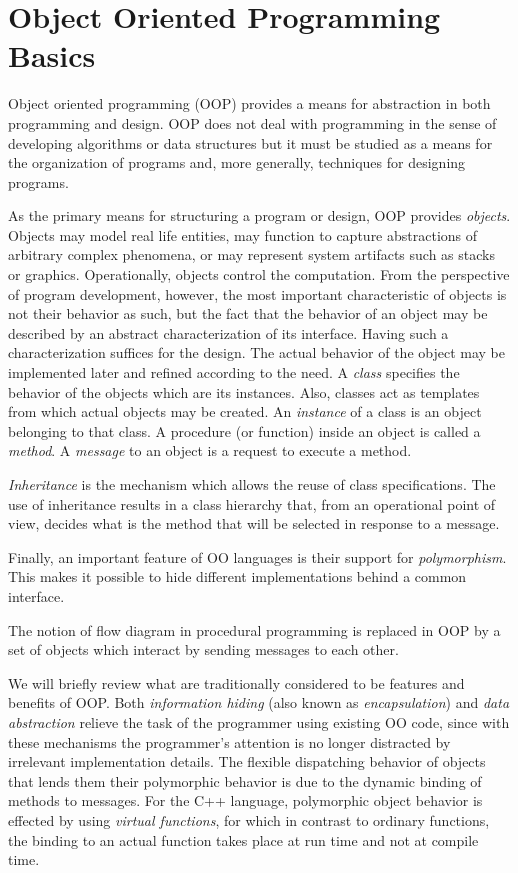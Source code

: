 \chapter{Object Oriented Programming Basics} \label{app:oo}

Object oriented programming (OOP) \cite{eliens} provides a means for
abstraction in both programming and design. OOP does not deal with
programming in the sense of developing algorithms or data structures
but it must be studied as a means for the organization of programs
and, more generally, techniques for designing programs.

As the primary means for structuring a program or design, OOP provides
\emph{objects}. Objects may model real life entities, may function to
capture abstractions of arbitrary complex phenomena, or may represent
system artifacts such as stacks or graphics.  Operationally, objects
control the computation. From the perspective of program development,
however, the most important characteristic of objects is not their
behavior as such, but the fact that the behavior of an object may be
described by an abstract characterization of its interface. Having
such a characterization suffices for the design. The actual behavior
of the object may be implemented later and refined according to the
need. A \emph{class} specifies the behavior of the objects which are
its instances. Also, classes act as templates from which actual
objects may be created.  An \emph{instance} of a class is an object
belonging to that class. A procedure (or function) inside an object is
called a \emph{method}. A \emph{message} to an object is a request to
execute a method.

\emph{Inheritance} is the mechanism which allows the reuse of class
specifications. The use of inheritance results in a class hierarchy
that, from an operational point of view, decides what is the method
that will be selected in response to a message.

Finally, an important feature of OO languages is their support for
\emph{polymorphism}. This makes it possible to hide different
implementations behind a common interface.

The notion of flow diagram in procedural programming is replaced in
OOP by a set of objects which interact by sending messages to each
other.

We will briefly review what are traditionally considered to be
features and benefits of OOP. Both \emph{information hiding} (also
known as \emph{encapsulation}) and \emph{data abstraction} relieve the
task of the programmer using existing OO code, since with these
mechanisms the programmer's attention is no longer distracted by
irrelevant implementation details. The flexible dispatching behavior
of objects that lends them their polymorphic behavior is due to the
dynamic binding of methods to messages. For the C++ language,
polymorphic object behavior is effected by using \emph{virtual
functions}, for which in contrast to ordinary functions, the binding
to an actual function takes place at run time and not at compile time.

